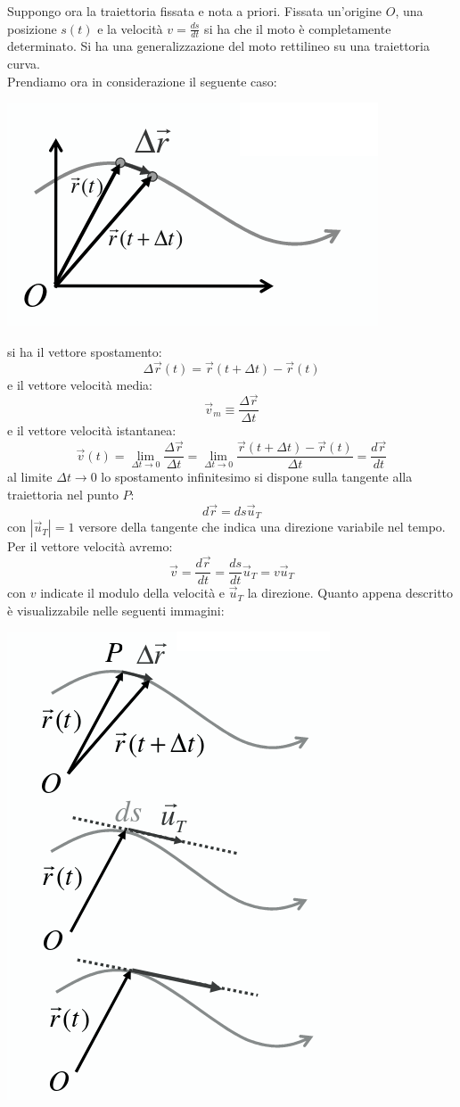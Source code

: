 \documentclass[a4paper,12pt, oneside]{book}
\begin{document}
Suppongo ora la traiettoria fissata e nota a priori. Fissata un'origine $O$, una posizione $s(t)$ e la velocità $v=\frac{ds}{dt}$ si ha che il moto è completamente determinato. Si ha una generalizzazione del moto rettilineo su una traiettoria curva.\\
Prendiamo ora in considerazione il seguente caso:
\begin{center}
	\includegraphics[scale=0.4]{img/pia3.png}
\end{center}
si ha il vettore spostamento:
$$\Delta\vec{r}(t)=\vec{r}(t+\Delta t)-\vec{r}(t)$$
e il vettore velocità media:
$$\vec{v}_m\equiv\frac{\Delta\vec{r}}{\Delta t}$$
e il vettore velocità istantanea:
$$\vec{v}(t)=\lim_{\Delta t\to 0}\frac{\Delta\vec{r}}{\Delta t}=\lim_{\Delta t\to 0}\frac{\vec{r}(t+\Delta t)-\vec{r}(t)}{\Delta t}=\frac{d\vec{r}}{dt}$$
al limite $\Delta t\to 0$ lo spostamento infinitesimo si dispone sulla tangente alla traiettoria nel punto $P$:
$$d\vec{r}=ds\vec{u}_T$$
con $|\vec{u}_T|=1$ versore della tangente che indica una direzione variabile nel tempo. Per il vettore velocità avremo:
$$\vec{v}=\frac{d\vec{r}}{dt}=\frac{ds}{dt}\vec{u}_T=v\vec{u}_T$$
con $v$ indicate il modulo della velocità e $\vec{u}_T$ la direzione.
\newpage
Quanto appena descritto è visualizzabile nelle seguenti immagini:
\begin{center}
	\includegraphics[scale=0.4]{img/pia4.png}
\end{center}
\end{document}
